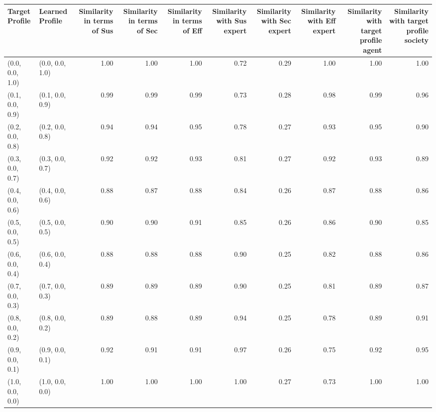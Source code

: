 \begin{tabular}{llrrrrrrrr}
\toprule
Target Profile & Learned Profile & Similarity in terms of Sus & Similarity in terms of Sec & Similarity in terms of Eff & Similarity with Sus expert & Similarity with Sec expert & Similarity with Eff expert & Similarity with target profile agent & Similarity with target profile society \\
\midrule
(0.0, 0.0, 1.0) & (0.0, 0.0, 1.0) & 1.00 & 1.00 & 1.00 & 0.72 & 0.29 & 1.00 & 1.00 & 1.00 \\
(0.1, 0.0, 0.9) & (0.1, 0.0, 0.9) & 0.99 & 0.99 & 0.99 & 0.73 & 0.28 & 0.98 & 0.99 & 0.96 \\
(0.2, 0.0, 0.8) & (0.2, 0.0, 0.8) & 0.94 & 0.94 & 0.95 & 0.78 & 0.27 & 0.93 & 0.95 & 0.90 \\
(0.3, 0.0, 0.7) & (0.3, 0.0, 0.7) & 0.92 & 0.92 & 0.93 & 0.81 & 0.27 & 0.92 & 0.93 & 0.89 \\
(0.4, 0.0, 0.6) & (0.4, 0.0, 0.6) & 0.88 & 0.87 & 0.88 & 0.84 & 0.26 & 0.87 & 0.88 & 0.86 \\
(0.5, 0.0, 0.5) & (0.5, 0.0, 0.5) & 0.90 & 0.90 & 0.91 & 0.85 & 0.26 & 0.86 & 0.90 & 0.85 \\
(0.6, 0.0, 0.4) & (0.6, 0.0, 0.4) & 0.88 & 0.88 & 0.88 & 0.90 & 0.25 & 0.82 & 0.88 & 0.86 \\
(0.7, 0.0, 0.3) & (0.7, 0.0, 0.3) & 0.89 & 0.89 & 0.89 & 0.90 & 0.25 & 0.81 & 0.89 & 0.87 \\
(0.8, 0.0, 0.2) & (0.8, 0.0, 0.2) & 0.89 & 0.88 & 0.89 & 0.94 & 0.25 & 0.78 & 0.89 & 0.91 \\
(0.9, 0.0, 0.1) & (0.9, 0.0, 0.1) & 0.92 & 0.91 & 0.91 & 0.97 & 0.26 & 0.75 & 0.92 & 0.95 \\
(1.0, 0.0, 0.0) & (1.0, 0.0, 0.0) & 1.00 & 1.00 & 1.00 & 1.00 & 0.27 & 0.73 & 1.00 & 1.00 \\
\bottomrule
\end{tabular}
